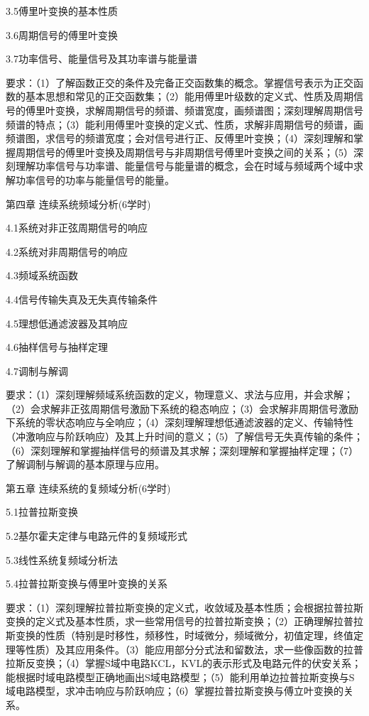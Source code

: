 \documentclass[letterpaper]{article}
\begin{document}
\quad\quad 3.5傅里叶变换的基本性质\par
\quad\quad 3.6周期信号的傅里叶变换\par
\quad\quad 3.7功率信号、能量信号及其功率谱与能量谱\par
\quad\quad 要求：（1）了解函数正交的条件及完备正交函数集的概念。掌握信号表示为正交函数的基本思想和常见的正交函数集；（2）能用傅里叶级数的定义式、性质及周期信号的傅里叶变换，求解周期信号的频谱、频谱宽度，画频谱图；深刻理解周期信号频谱的特点；（3）能利用傅里叶变换的定义式、性质，求解非周期信号的频谱，画频谱图，求信号的频谱宽度；会对信号进行正、反傅里叶变换；（4）深刻理解和掌握周期信号的傅里叶变换及周期信号与非周期信号傅里叶变换之间的关系；（5）深刻理解功率信号与功率谱、能量信号与能量谱的概念，会在时域与频域两个域中求解功率信号的功率与能量信号的能量。\par
\vspace{1em}
第四章 \quad\quad 连续系统频域分析(6学时)\par
\quad\quad 4.1系统对非正弦周期信号的响应\par
\quad\quad 4.2系统对非周期信号的响应\par
\quad\quad 4.3频域系统函数\par
\quad\quad 4.4信号传输失真及无失真传输条件\par
\quad\quad 4.5理想低通滤波器及其响应\par
\quad\quad 4.6抽样信号与抽样定理\par
\quad\quad 4.7调制与解调\par
\quad\quad 要求：（1）深刻理解频域系统函数的定义，物理意义、求法与应用，并会求解；（2）会求解非正弦周期信号激励下系统的稳态响应；（3）会求解非周期信号激励下系统的零状态响应与全响应；（4）深刻理解理想低通滤波器的定义、传输特性（冲激响应与阶跃响应）及其上升时间的意义；（5）了解信号无失真传输的条件；（6）深刻理解和掌握抽样信号的频谱及其求解；深刻理解和掌握抽样定理；（7）了解调制与解调的基本原理与应用。\par
\vspace{1em}
第五章 \quad 连续系统的复频域分析(6学时)\par
\quad\quad 5.1拉普拉斯变换 \par
\quad\quad 5.2基尔霍夫定律与电路元件的复频域形式\par
\quad\quad 5.3线性系统复频域分析法\par
\quad\quad 5.4拉普拉斯变换与傅里叶变换的关系\par
\quad\quad 要求：（1）深刻理解拉普拉斯变换的定义式，收敛域及基本性质；会根据拉普拉斯变换的定义式及基本性质，求一些常用信号的拉普拉斯变换；（2）正确理解拉普拉斯变换的性质（特别是时移性，频移性，时域微分，频域微分，初值定理，终值定理等性质）及其应用条件。（3）能应用部分分式法和留数法，求一些像函数的拉普拉斯反变换；（4）掌握S域中电路KCL，KVL的表示形式及电路元件的伏安关系；能根据时域电路模型正确地画出S域电路模型；（5）能利用单边拉普拉斯变换与S域电路模型，求冲击响应与阶跃响应；（6）掌握拉普拉斯变换与傅立叶变换的关系。\par
\end{document}
